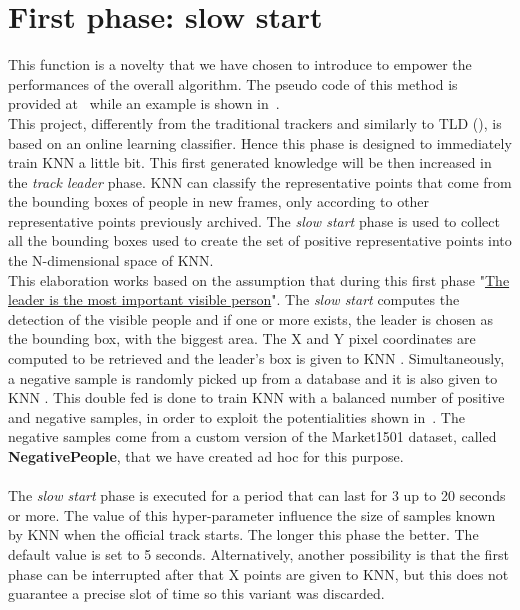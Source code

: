 \section{First phase: slow start} \label{sec:slowStartPhase}
This function is a novelty that we have chosen to introduce to empower the performances of the overall algorithm. The pseudo code of this method is provided at~ while an example is shown in~.\\
This project, differently from the traditional trackers and similarly to TLD (), is based on an online learning classifier. Hence this phase is designed to immediately train KNN a little bit. This first generated knowledge will be then increased in the \textit{track leader} phase. KNN can classify the representative points that come from the bounding boxes of people in new frames, only according to other representative points previously archived. The \textit{slow start} phase is used to collect all the bounding boxes used to create the set of positive representative points into the N-dimensional space of KNN.\\
This elaboration works based on the assumption that during this first phase "\ul{The leader is the most important visible person}". The \textit{slow start} computes the detection of the visible people  and if one or more exists, the leader is chosen as the bounding box, with the biggest area. The X and Y pixel coordinates are computed to be retrieved  and the leader's box is given to KNN . Simultaneously, a negative sample is randomly picked up from a database and it is also given to KNN . This double fed is done to train KNN with a balanced number of positive and negative samples, in order to exploit the potentialities shown in~. The negative samples come from a custom version of the Market1501 dataset\cite{market1501}, called \textbf{NegativePeople}, that we have created ad hoc for this purpose.\\
\\
The \textit{slow start} phase is executed for a period that can last for 3 up to 20 seconds or more. The value of this hyper-parameter influence the size of samples known by KNN when the official track starts. The longer this phase the better. The default value is set to 5 seconds. Alternatively, another possibility is that the first phase can be interrupted after that X points are given to KNN, but this does not guarantee a precise slot of time so this variant was discarded.

